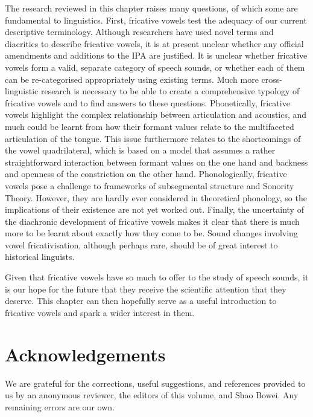 \documentclass[output=paper,colorlinks,citecolor=brown,chinesefont]{langscibook}
\begin{document}
The research reviewed in this chapter raises many questions, of which some are fundamental to linguistics. First, fricative vowels test the adequacy of our current descriptive terminology. Although researchers have used novel terms and diacritics to describe fricative vowels, it is at present unclear whether any official amendments and additions to the IPA are justified. It is unclear whether fricative vowels form a valid, separate category of speech sounds, or whether each of them can be re-categorised appropriately using existing terms. Much more cross-linguistic research is necessary to be able to create a comprehensive typology of fricative vowels and to find answers to these questions. Phonetically, fricative vowels highlight the complex relationship between articulation and acoustics, and much could be learnt from how their formant values relate to the multifaceted articulation of the tongue. This issue furthermore relates to the shortcomings of the vowel quadrilateral, which is based on a model that assumes a rather straightforward interaction between formant values on the one hand and backness and openness of the constriction on the other hand. Phonologically, fricative vowels pose a challenge to frameworks of subsegmental structure and Sonority Theory. However, they are hardly ever considered in theoretical phonology, so the implications of their existence are not yet worked out. Finally, the uncertainty of the diachronic development of fricative vowels makes it clear that there is much more to be learnt about exactly how they come to be. Sound changes involving vowel fricativisation, although perhaps rare, should be of great interest to historical linguists.

Given that fricative vowels have so much to offer to the study of speech sounds, it is our hope for the future that they receive the scientific attention that they deserve. This chapter can then hopefully serve as a useful introduction to fricative vowels and spark a wider interest in them.

\section*{Acknowledgements}
We are grateful for the corrections, useful suggestions, and references provided to us by an anonymous reviewer, the editors of this volume, and Shao Bowei. Any remaining errors are our own.

\sloppy
\printbibliography[heading=subbibliography,notkeyword=this]
\end{document}
